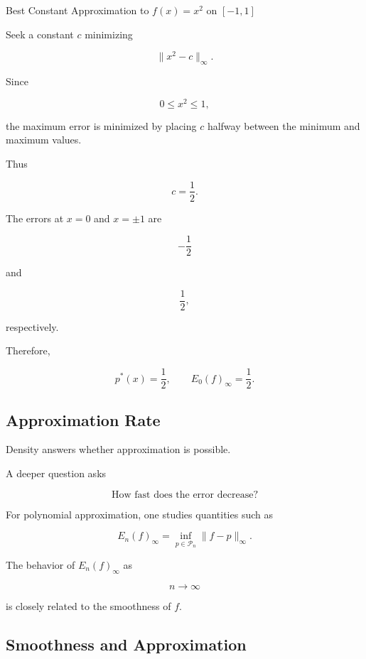 \begin{workedexamplebox}{Best Constant Approximation to \(f(x)=x^2\) on \([-1,1]\)}

Seek a constant \(c\) minimizing

\[
\|x^2-c\|_\infty.
\]

Since

\[
0\leq x^2\leq1,
\]

the maximum error is minimized by placing \(c\) halfway between the
minimum and maximum values.

Thus

\[
c=\frac12.
\]

The errors at \(x=0\) and \(x=\pm1\) are

\[
-\frac12
\]

and

\[
\frac12,
\]

respectively.

Therefore,

\begin{answerbox}
\[
\boxed{
p^\ast(x)=\frac12,
\qquad
E_0(f)_\infty=\frac12.
}
\]
\end{answerbox}

\end{workedexamplebox}

\subsection{Approximation Rate}
\label{subsec:approximation-rate}

Density answers whether approximation is possible.

A deeper question asks

\[
\boxed{
\text{How fast does the error decrease?}
}
\]

For polynomial approximation, one studies quantities such as

\[
\boxed{
E_n(f)_\infty
=
\inf_{p\in\mathcal{P}_n}
\|f-p\|_\infty.
}
\]

The behavior of \(E_n(f)_\infty\) as

\[
n\to\infty
\]

is closely related to the smoothness of \(f\).

\subsection{Smoothness and Approximation}
\label{subsec:smoothness-approximation}


